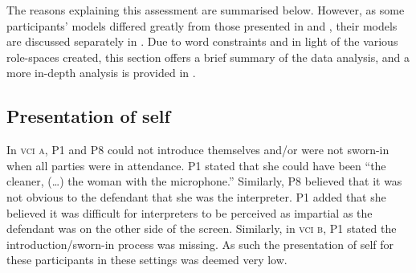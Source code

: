\documentclass[output=paper]{langsci/langscibook}
\begin{document}
\begin{table}
\caption{Role-space in \textsc{vci b}\label{tab:devaux:3}}
\end{table}

The reasons explaining this assessment are summarised below. However, as some participants’ models differed greatly from those presented in  and , their models are discussed separately in . Due to word constraints and in light of the various role-spaces created, this section offers a brief summary of the data analysis, and a more in-depth analysis is provided in \citet{Devaux2017b}.

\subsection{Presentation of self}
In \textsc{vci a}, P1 and P8 could not introduce themselves and/or were not sworn-in when all parties were in attendance. P1 stated that she could have been “the cleaner, (…) the woman with the microphone.” Similarly, P8 believed that it was not obvious to the defendant that she was the interpreter. P1 added that she believed it was difficult for interpreters to be perceived as impartial as the defendant was on the other side of the screen. Similarly, in \textsc{vci b}, P1 stated the introduction/sworn-in process was missing. As such the presentation of self for these participants in these settings was deemed very low. 
\end{document}

